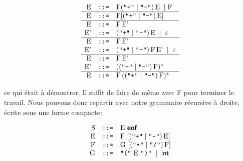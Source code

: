 \documentclass[11pt,a4paper]{article}
\newcommand{\assign}{\mbox{\texttt{::=}}\xspace}
\newcommand{\str}[1]{\texttt{"{#1}"}}
\newcommand{\eof}{\textsf{\textbf{eof}}\xspace}
\begin{document}
\[
\begin{array}{rcl}
  \textrm{E}  & \assign & \textrm{F} (\str{+} \mid \str{-}) \,
                         \textrm{E} \; \mid \textrm{F}\\
  \hline
  \textrm{E}  & \assign & \textrm{F} [(\str{+} \mid \str{-}) \,
                         \textrm{E}]\\
  \hline
  \textrm{E}  & \assign & \textrm{F} \, \textrm{E'}\\
  \textrm{E'} & \assign & (\str{+} \mid \str{-}) \, \textrm{E} \; \mid
                         \; \varepsilon\\
  \hline
  \textrm{E}  & \assign & \textrm{F} \, \textrm{E'}\\
  \textrm{E'} & \assign & (\str{+} \mid \str{-}) \, \textrm{F} \,
                         \textrm{E'} \; \mid \; \varepsilon\\
  \hline
  \textrm{E}  & \assign & \textrm{F} \, \textrm{E'}\\
  \textrm{E'} & \assign & ((\str{+} \mid \str{-}) \, \textrm{F})^{*}\\
  \hline
  \textrm{E}  & \assign & \textrm{F} \, ((\str{+} \mid \str{-}) \, \textrm{F})^{*}
\end{array}
\]

\noindent ce qui était à démontrer. Il suffit de faire de même avec F
pour terminer le travail. Nous pouvons donc repartir avec notre
grammaire récursive à droite, écrite sous une forme compacte:

\[
\begin{array}{rcl}
  \textrm{S} & \assign & \textrm{E} \ \eof\\
  \textrm{E} & \assign & \textrm{F} \ [(\str{+} \mid \str{-}) \, \textrm{E}]\\
  \textrm{F} & \assign & \textrm{G} \ [(\str{*} \mid  \str{/}) \, \textrm{F}]\\
  \textrm{G} & \assign & \str{(} \ \textrm{E} \ \str{)} \; \mid \; \textsf{int}
\end{array}
\]
\end{document}
